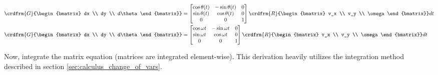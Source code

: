 \begin{align*}
  \crdfrm{G}{\begin{bmatrix}
    dx \\
    dy \\
    d\theta
  \end{bmatrix}} &=
  \begin{bmatrix}
    \cos\theta(t) & -\sin\theta(t) & 0 \\
    \sin\theta(t) &  \cos\theta(t) & 0 \\
                0 &              0 & 1
  \end{bmatrix}
  \crdfrm{R}{\begin{bmatrix}
    v_x \\
    v_y \\
    \omega
  \end{bmatrix}} dt \\
  \crdfrm{G}{\begin{bmatrix}
    dx \\
    dy \\
    d\theta
  \end{bmatrix}} &=
  \begin{bmatrix}
    \cos\omega t & -\sin\omega t & 0 \\
    \sin\omega t &  \cos\omega t & 0 \\
               0 &             0 & 1
  \end{bmatrix}
  \crdfrm{R}{\begin{bmatrix}
    v_x \\
    v_y \\
    \omega
  \end{bmatrix}} dt
\end{align*}

Now, integrate the matrix equation (matrices are integrated element-wise). This
derivation heavily utilizes the integration method described in section
\ref{sec:calculus_change_of_vars}.


